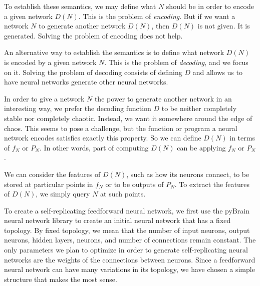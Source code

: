 \documentclass[12pt]{article}
\newcommand{\term}[1]{\emph{#1}}
\begin{document}
To establish these semantics,
we may define what $N$ should be
in order to encode a given network $D(N)$.
This is the problem of \term{encoding}.
But if we want a network $N$
to generate another network $D(N)$,
then $D(N)$ is not given.
It is generated.
Solving the problem of encoding does not help.

An alternative way to establish the semantics
is to define what network $D(N)$ is encoded
by a given network $N$.
This is the problem of \term{decoding},
and we focus on it.
Solving the problem of decoding
consists of defining $D$
and allows us to have neural networks
generate other neural networks.

In order to give a network $N$
the power to generate another network
in an interesting way,
we prefer the decoding function $D$
to be neither completely stable
nor completely chaotic.
Instead, we want it somewhere around the edge of chaos.%
\cite{langton1990edgechaos}%
\cite{bertschinger2004edgechaos}
This seems to pose a challenge,
but the function or program a neural network encodes
satisfies exactly this property.
So we can define $D(N)$ in terms of $f_N$ or $P_N$.
In other words, part of computing $D(N)$
can be applying $f_N$ or $P_N$.

We can consider the features of $D(N)$,
such as how its neurons connect,
to be stored at particular points
in $f_N$
or to be outputs of $P_N$.
To extract the features of $D(N)$,
we simply query $N$ at such points.



\label{feedforward}

To create a self-replicating feedforward neural network,
we first use the pyBrain neural network library \cite{schaul2010}
to create an initial neural network that has a fixed topology.
By fixed topology, we mean that
the number of input neurons,
output neurons,
hidden layers,
neurons, and number of connections remain constant.
The only parameters we plan to optimize
in order to generate self-replicating neural networks
are the weights of the connections between neurons.
Since a feedforward neural network
can have many variations in its topology,
we have chosen a simple structure that makes the most sense.
\end{document}
